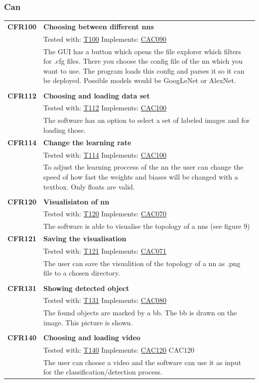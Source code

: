 \documentclass[parskip=full]{scrartcl}
\begin{document}
\subsubsection{Can}
\begin{tabular}{p{2cm}p{11.4cm}}
\textbf{CFR100} \hypertarget{CFR100} & \textbf{Choosing between different \glspl{nn}}\\
& Tested with: \hyperlink{T100}{T100} Implements: \hyperlink{CAC090}{CAC090} \\
& The GUI has a button which opens the file explorer which filters for .cfg files. There you choose the config file of the \gls{nn} which you want to use. The program loads this config and parses it so it can be deployed. Possible models would be GoogLeNet or AlexNet.\\
& \\
\textbf {CFR112} \hypertarget{CFR112} & \textbf{Choosing and loading data set} \\
& Tested with: \hyperlink{T112}{T112} Implements: \hyperlink{CAC100}{CAC100}\\
& The software has an option to select a set of labeled images and for loading those.\\
\textbf {CFR114} \hypertarget{CFR114} & \textbf{Change the learning rate} \\
& Tested with: \hyperlink{T114}{T114} Implements: \hyperlink{CAC100}{CAC100} \\
& To adjust the learning proccess of the \gls{nn} the user can change the speed of how fast the weights and biases will be changed with a textbox. Only floats are valid.\\
& \\
\textbf {CFR120} \hypertarget{CFR120} & \textbf{Visualisiaton of \gls{nn}} \\
& Tested with: \hyperlink{T120}{T120} Implements: \hyperlink{CAC070}{CAC070} \\
& The software is able to visualise the topology of a \glspl{nn} (see figure 9) \\
\textbf{CFR121} \hypertarget{CFR121} & \textbf{Saving the visualisation}\\
& Tested with: \hyperlink{T121}{T121} Implements: \hyperlink{CAC071}{CAC071} \\
& The user can save the visualition of the topology of a \gls{nn} as .png file to a chosen directory.\\
& \\
\textbf {CFR131} \hypertarget{CFR131} & \textbf{Showing detected object} \\
& Tested with: \hyperlink{T131}{T131} Implements: \hyperlink{CAC080}{CAC080}\\
& The found objects are marked by a \gls{bb}. The \gls{bb} is drawn on the image. This picture is shown.\\
& \\
\textbf{CFR140} \hypertarget{CFR140} & \textbf{Choosing and loading video}\\
& Tested with: \hyperlink{T140}{T140} Implements: \hyperlink{CAC120}{CAC120} CAC120 \\
& The user can choose a video and the software can use it as input for the classification/detection process.\\
\end{tabular}
\end{document}
